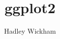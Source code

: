 
\renewcommand{\setflag}{\newif \ifwhole 
\wholetrue}

\title{ggplot2} 
\author{Hadley Wickham} 
\maketitle 

\tableofcontents






